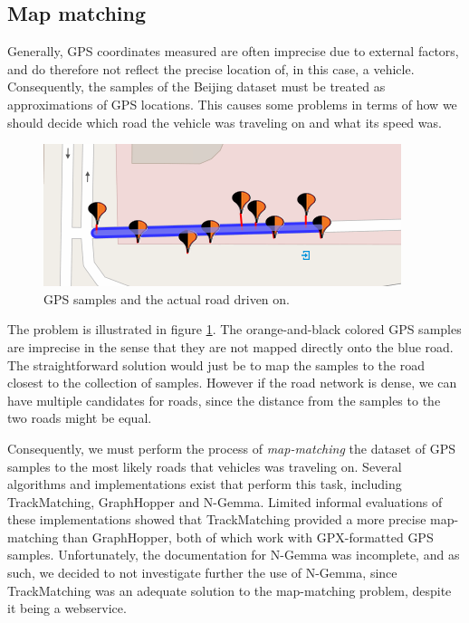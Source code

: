 \subsection{Map matching}\label{sec:mapmatching}
Generally, GPS coordinates measured are often imprecise due to external factors, and do therefore not reflect the precise location of, in this case, a vehicle. Consequently, the samples of the Beijing dataset must be treated as approximations of GPS locations. This causes some problems in terms of how we should decide which road the vehicle was traveling on and what its speed was.

\begin{figure}
\includegraphics[scale=1]{figures/mapmatching.png}
\caption{GPS samples and the actual road driven on.}
\label{fig:mapmatching}
\end{figure}

The problem is illustrated in figure \ref{fig:mapmatching}. The orange-and-black colored GPS samples are imprecise in the sense that they are not mapped directly onto the blue road. The straightforward solution would just be to map the samples to the road closest to the collection of samples. However if the road network is dense, we can have multiple candidates for roads, since the distance from the samples to the two roads might be equal.

Consequently, we must perform the process of \emph{map-matching} the dataset of GPS samples to the most likely roads that vehicles was traveling on. Several algorithms and implementations exist that perform this task, including TrackMatching, GraphHopper and N-Gemma.  Limited informal evaluations of these implementations showed that TrackMatching provided a more precise map-matching than GraphHopper, both of which work with GPX-formatted GPS samples. Unfortunately, the documentation for N-Gemma was incomplete, and as such, we decided to not investigate further the use of N-Gemma, since TrackMatching was an adequate solution to the map-matching problem, despite it being a webservice.

